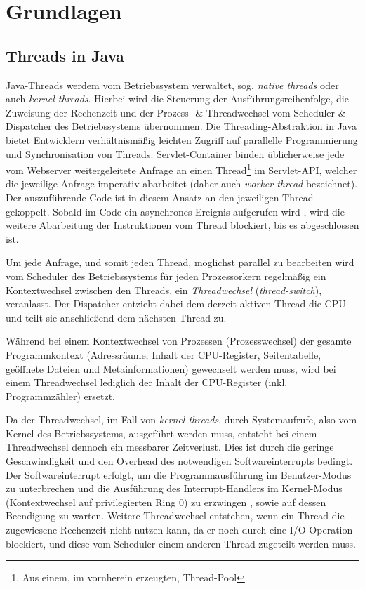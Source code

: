 \section{Grundlagen}
\label{section:grundlagen}

\subsection{Threads in Java}
\label{sections:treads_prozesse}
Java-Threads werdem vom Betriebssystem verwaltet, sog. \textit{native threads} oder auch \textit{kernel threads}.
Hierbei wird die Steuerung der Ausführungsreihenfolge, die Zuweisung der Rechenzeit und der Prozess- \& Threadwechsel
vom Scheduler \& Dispatcher des Betriebssystems übernommen\parencite[Kapitel 2]{Tanenbaum2016}.
Die Threading-Abstraktion in Java bietet Entwicklern verhältnismäßig leichten Zugriff auf parallelle Programmierung und Synchronisation von Threads.
Servlet-Container binden üblicherweise jede vom Webserver weitergeleitete Anfrage an einen
Thread\footnote{Aus einem, im vornherein erzeugten, Thread-Pool} im Servlet-API, welcher die jeweilige Anfrage imperativ abarbeitet
(daher auch \textit{worker thread} bezeichnet).
Der auszuführende Code ist in diesem Ansatz an den jeweiligen Thread gekoppelt. Sobald im Code ein asynchrones Ereignis aufgerufen wird
, wird die weitere Abarbeitung der Instruktionen vom Thread blockiert, bis es abgeschlossen ist.

\noindent
Um jede Anfrage, und somit jeden Thread, möglichst parallel zu bearbeiten wird vom Scheduler
des Betriebssystems für jeden Prozessorkern regelmäßig ein Kontextwechsel zwischen den Threads,
ein \textit{Threadwechsel} (\textit{thread-switch}), veranlasst.
Der Dispatcher entzieht dabei dem derzeit aktiven Thread die CPU und teilt sie anschließend dem nächsten Thread zu.

Während bei einem Kontextwechsel von Prozessen (Prozesswechsel) der gesamte Programmkontext (Adressräume, Inhalt der CPU-Register,
Seitentabelle, geöffnete Dateien und Metainformationen)
gewechselt werden muss, wird bei einem Threadwechsel lediglich der Inhalt der CPU-Register (inkl. Programmzähler)
ersetzt\parencite{Brosenne2021}\parencite{Mosberger2002}.

\noindent
Da der Threadwechsel, im Fall von \textit{kernel threads}, durch Systemaufrufe, also vom Kernel des Betriebssystems, ausgeführt werden muss, entsteht
bei einem Threadwechsel dennoch ein messbarer Zeitverlust.
Dies ist durch die geringe Geschwindigkeit und den Overhead des notwendigen Softwareinterrupts bedingt.
Der Softwareinterrupt erfolgt, um die Programmausführung im Benutzer-Modus zu unterbrechen und die Ausführung des Interrupt-Handlers im
Kernel-Modus (Kontextwechsel auf privilegierten Ring 0) zu erzwingen , sowie auf dessen Beendigung zu warten.
Weitere Threadwechsel entstehen, wenn ein Thread die zugewiesene Rechenzeit nicht nutzen kann, da er noch durch eine I/O-Operation
blockiert, und diese vom Scheduler einem anderen Thread zugeteilt werden muss.

